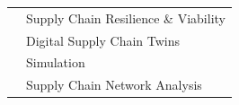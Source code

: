 

\renewcommand{\thefootnote}{\fnsymbol{footnote}}
\setcounter{footnote}{0}

\begin{longtable}[l]{@{}p{} p{}}
    & Supply Chain Resilience \& Viability \\
    & Digital Supply Chain Twins \\
    & Simulation \\
    & Supply Chain Network Analysis \\
\end{longtable}
